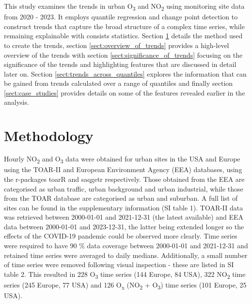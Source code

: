 \documentclass[journal abbreviation, manuscript]{copernicus}
\begin{document}
This study examines the trends in urban O\textsubscript{3} and NO\textsubscript{2} using monitoring site data from 2020 - 2023. It employs quantile regression and change point detection to construct trends that capture the broad structure of a complex time series, while remaining explainable with consists statistics. Section \ref{sect:method} details the method used to create the trends, section \ref{sect:overview_of_trends} provides a high-level overview of the trends with section \ref{sect:significance_of_trends} focusing on the significance of the trends and highlighting features that are discussed in detail later on. Section \ref{sect:trends_across_quantiles} explores the information that can be gained from trends calculated over a range of quantiles and finally section \ref{sect:case_studies} provides details on some of the features revealed earlier in the analysis. 


\section{Methodology} \label{sect:method}
Hourly NO\textsubscript{2} and O\textsubscript{3} data were obtained for urban sites in the USA and Europe using the TOAR-II \citep{toar_db} and European Environment Agency (EEA) \citep{eea_1, eea_2} databases, using the r-packages toarR \citep{drysdale_2024_14537446} and saqgetr \citep{saqgetr} respectively. Those obtained from the EEA are categorised as urban traffic, urban background and urban industrial, while those from the TOAR database are categorised as urban and suburban. A full list of sites can be found in the supplementary information (SI table 1).  TOAR-II data was retrieved between 2000-01-01 and 2021-12-31 (the latest available) and EEA data between 2000-01-01 and 2023-12-31, the latter being extended longer so the effects of the COVID-19 pandemic could be observed more clearly. Time series were required to have 90 \% data coverage between 2000-01-01 and 2021-12-31 and retained time series were averaged to daily medians. Additionally, a small number of time series were removed following visual inspection - these are listed in SI table 2. This resulted in 228 O\textsubscript{3} time series (144 Europe, 84 USA), 322 NO\textsubscript{2} time series (245 Europe, 77 USA) and 126 O\textsubscript{x} (NO\textsubscript{2} + O\textsubscript{3}) time series (101 Europe, 25 USA).
\end{document}
